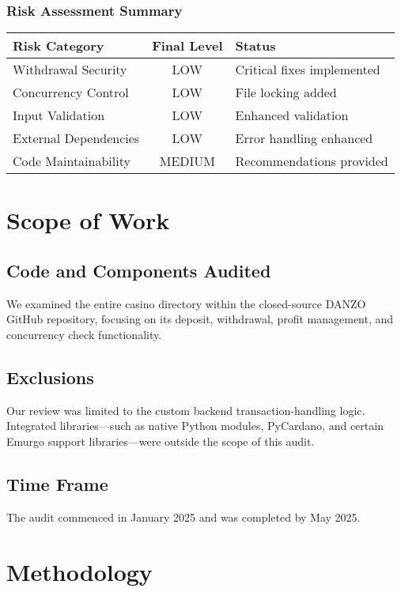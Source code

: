 \documentclass[11pt,a4paper]{article}
\begin{document}
\subsubsection{Risk Assessment Summary}
\begin{center}
\begin{tabular}{|l|c|l|}
\hline
\textbf{Risk Category} & \textbf{Final Level} & \textbf{Status} \\
\hline
Withdrawal Security & \textcolor{danzoGreen}{LOW} & Critical fixes implemented \\
Concurrency Control & \textcolor{danzoGreen}{LOW} & File locking added \\
Input Validation & \textcolor{danzoGreen}{LOW} & Enhanced validation \\
External Dependencies & \textcolor{danzoGreen}{LOW} & Error handling enhanced \\
Code Maintainability & \textcolor{danzoOrange}{MEDIUM} & Recommendations provided \\
\hline
\end{tabular}
\end{center}

\section{Scope of Work}

\subsection{Code and Components Audited}
We examined the entire casino directory within the closed-source DANZO GitHub repository, focusing on its deposit, withdrawal, profit management, and concurrency check functionality.

\subsection{Exclusions}
Our review was limited to the custom backend transaction-handling logic. Integrated libraries—such as native Python modules, PyCardano, and certain Emurgo support libraries—were outside the scope of this audit.

\subsection{Time Frame}
The audit commenced in January 2025 and was completed by May 2025.

\section{Methodology}
\end{document}
